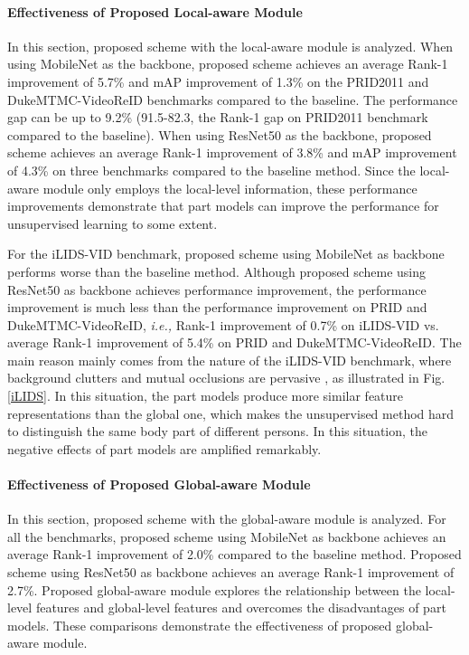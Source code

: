 \documentclass{cta-author}
\begin{document}
	\paragraph{Effectiveness of Proposed Local-aware Module}
	In this section, proposed scheme with the local-aware module is analyzed. When using MobileNet as the backbone, proposed scheme achieves an average Rank-1 improvement of 5.7\% and mAP improvement of 1.3\% on the PRID2011 and DukeMTMC-VideoReID benchmarks compared to the baseline. The performance gap can be up to 9.2\% (91.5-82.3, the Rank-1 gap on PRID2011 benchmark compared to the baseline). When using ResNet50 as the backbone, proposed scheme achieves an average Rank-1 improvement of 3.8\% and mAP improvement of 4.3\% on three benchmarks compared to the baseline method. Since the local-aware module only employs the local-level information, these performance improvements demonstrate that part models can improve the performance for unsupervised learning to some extent.
	
	For the iLIDS-VID benchmark, proposed scheme using MobileNet as backbone performs worse than the baseline method. Although proposed scheme using ResNet50 as backbone achieves performance improvement, the performance improvement is much less than the performance improvement on PRID and DukeMTMC-VideoReID, \textit{i.e.,} Rank-1 improvement of 0.7\% on iLIDS-VID vs. average Rank-1 improvement of 5.4\% on PRID and DukeMTMC-VideoReID. The main reason mainly comes from the nature of the iLIDS-VID benchmark, where background clutters and mutual occlusions are pervasive \cite{RN385} \cite{RN96}, as illustrated in Fig. \ref{iLIDS}. In this situation, the part models produce more similar feature representations than the global one, which makes the unsupervised method hard to distinguish the same body part of different persons. In this situation, the negative effects of part models are amplified remarkably.

	\paragraph{Effectiveness of Proposed Global-aware Module}
	In this section, proposed scheme with the global-aware module is analyzed. For all the benchmarks, proposed scheme using MobileNet as backbone achieves an average Rank-1 improvement of 2.0\% compared to the baseline method. Proposed scheme using ResNet50 as backbone achieves an average Rank-1 improvement of 2.7\%. Proposed global-aware module explores the relationship between the local-level features and global-level features and overcomes the disadvantages of part models. These comparisons demonstrate the effectiveness of proposed global-aware module.
	
\end{document}
